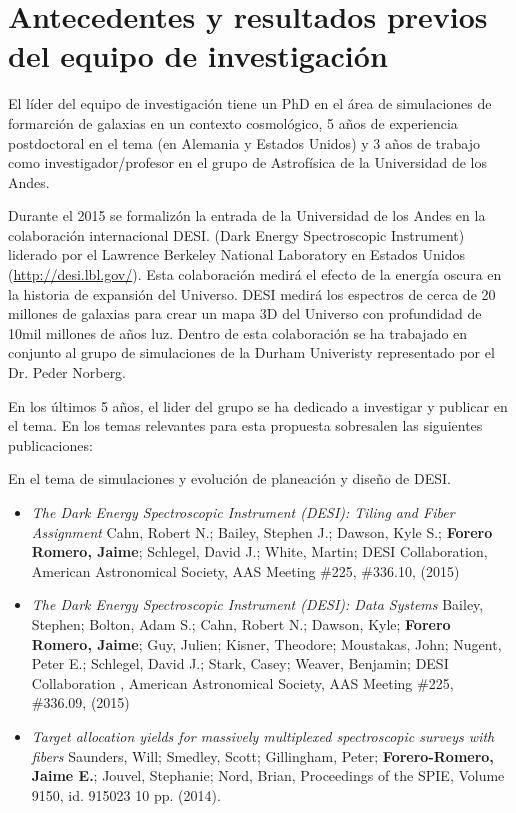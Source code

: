 \section{Antecedentes y resultados previos del equipo de
  investigaci\'on} 

El l\'ider del equipo de investigaci\'on tiene un PhD en el \'area de
simulaciones de formarci\'on de galaxias en un  contexto
cosmol\'ogico, 5 a\~nos de experiencia postdoctoral en el tema (en
Alemania y Estados Unidos) y 3 a\~nos de trabajo como
investigador/profesor en el grupo de  Astrof\'isica de la Universidad
de los Andes. 


Durante el 2015 se formaliz\'on la entrada de la Universidad de los Andes en la colaboraci\'on internacional DESI. (Dark Energy Spectroscopic Instrument) liderado por el Lawrence
Berkeley National Laboratory en Estados Unidos
(\url{http://desi.lbl.gov/}). 
Esta colaboraci\'on medir\'a el efecto
de la energ\'ia oscura en la historia de expansi\'on del
Universo. 
DESI medir\'a los espectros de cerca de 20 millones de galaxias
para crear un mapa 3D del Universo con  profundidad de 10mil
millones de a\~nos luz. 
Dentro de esta colaboraci\'on se ha trabajado en conjunto al grupo de
simulaciones de la Durham Univeristy representado por el Dr. Peder
Norberg.  



En los \'ultimos 5 a\~nos, el lider del grupo se ha dedicado a
investigar y publicar en el tema. En los temas relevantes para esta
propuesta sobresalen las siguientes publicaciones:

\noindent
En el tema de simulaciones y evoluci\'on de planeaci\'on y dise\~no de
DESI.

\begin{itemize}
\item {\it The Dark Energy Spectroscopic Instrument (DESI): Tiling and
  Fiber Assignment} Cahn, Robert N.; Bailey, Stephen J.; Dawson, Kyle
  S.; {\bf Forero Romero, Jaime}; Schlegel, David J.; White, Martin;
  DESI Collaboration, American Astronomical Society, AAS Meeting \#225,
  \#336.10, (2015)
\item {\it The Dark Energy Spectroscopic Instrument (DESI): Data
  Systems} 	
	Bailey, Stephen; Bolton, Adam S.; Cahn, Robert N.; Dawson,
        Kyle; {\bf Forero Romero, Jaime}; Guy, Julien; Kisner, Theodore;
        Moustakas, John; Nugent, Peter E.; Schlegel, David J.; Stark,
        Casey; Weaver, Benjamin; DESI Collaboration , American
        Astronomical Society, AAS Meeting \#225, \#336.09, (2015)
\item {\it Target allocation yields for massively multiplexed
  spectroscopic surveys with fibers} 	
	Saunders, Will; Smedley, Scott; Gillingham, Peter;
        {\bf Forero-Romero, Jaime E.}; Jouvel, Stephanie; Nord, Brian,
        Proceedings of the SPIE, Volume 9150, id. 915023 10
        pp. (2014). 
\end{itemize}



